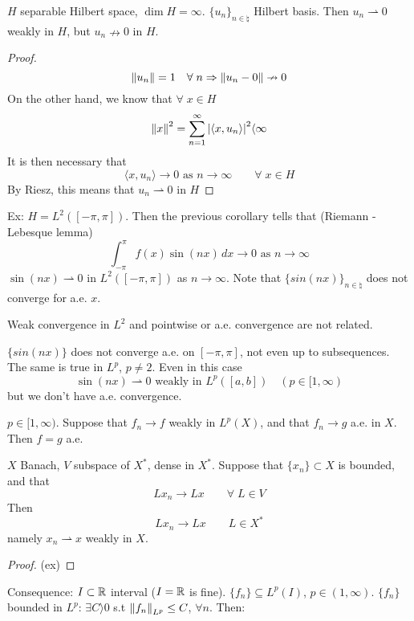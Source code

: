 \begin{corollary}
    \(H\) separable Hilbert space, \(\dim H = \infty\). \(\{u_n\}_{n \in \natural}\) Hilbert basis. Then \(u_n \rightharpoonup 0\) weakly in \(H\), but \(u_n \nrightarrow 0\) in \(H\).
\end{corollary}
\begin{proof}
    \[
        \norm{u_n}=1 \quad \forall\; n \Rightarrow \norm{u_n -0} \nrightarrow 0 
    \]
    On the other hand, we know that \(\forall \; x \in H\)
    \[
        \norm{x}^2 = \sum_{n=1}^\infty \abs{\langle x, u_n\rangle  }^2 \langle  \infty
    \]
    It is then necessary that
    \[
        \langle x, u_n\rangle   \to 0 \text{ as } n \to \infty \qquad \forall\; x \in H
    \]
    By Riesz, this means that \(u_n \rightharpoonup 0\) in \(H\)
\end{proof}

Ex: \(H = L^2([-\pi, \pi])\). Then the previous corollary tells that (Riemann - Lebesque lemma)
\[
    \int_{-\pi}^\pi f(x) \sin (nx) \, dx \to 0 \text{ as } n \to \infty
\]                
\(\sin(nx) \rightharpoonup 0\) in \(L^2([-\pi, \pi])\) as \(n \to \infty\). Note that \(\{sin(nx)\}_{n \in \natural}\) does not converge for a.e. \(x\).

Weak convergence in \(L^2\) and pointwise or a.e. convergence are not related.

\(\{sin(nx)\}\) does not converge a.e. on \([-\pi, \pi]\), not even up to subsequences. 
The same is true in \(L^p\), \(p \neq 2\). Even in this case
\[
    \sin(nx) \rightharpoonup 0 \text{ weakly in } L^p([a,b]) \quad (p \in [1, \infty)
\] 
but we don't have a.e. convergence.

\begin{proposition}
    \(p \in [1, \infty)\). Suppose that \(f_n \to f\) weakly in \(L^p(X)\), and that \(f_n \to g\) a.e. in \(X\). Then \(f=g\) a.e.
\end{proposition}

\begin{proposition}
    \(X\) Banach, \(V\) subspace of \(X^*\), dense in \(X^*\). Suppose that \(\{x_n\} \subset X\) is bounded, and that 
    \[
        L x_n \to Lx \qquad \forall\; L \in V
    \]
    Then
    \[
        L x_n \to Lx \qquad L \in X^*
    \]
    namely \(x_n \rightharpoonup x\) weakly in \(X\).
\end{proposition}
\begin{proof}
    (ex)
\end{proof}

Consequence: \(I \subset \mathbb{R}\) interval (\(I= \mathbb{R}\) is fine). \(\{f_n\} \subseteq L^p(I)\), \(p \in (1, \infty)\). 
\(\{f_n\}\) bounded in \(L^p\): \(\exists C\rangle  0\) s.t \(\norm{f_n}_{L^p} \leq C\), \(\forall n\). Then:

